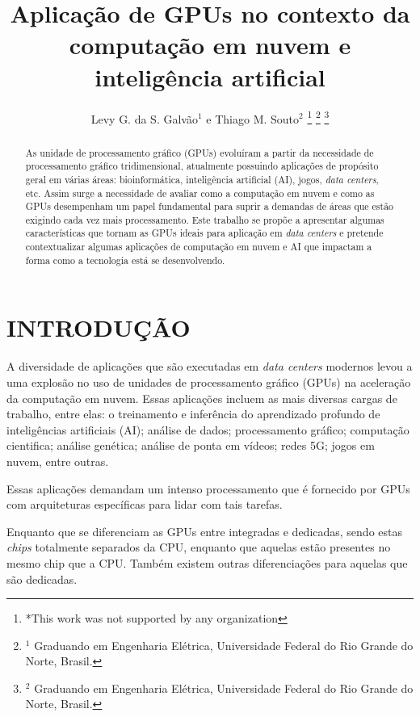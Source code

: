 \documentclass[letterpaper, 10 pt, conference]{ieeeconf}  %
\title{\LARGE \bf
Aplicação de GPUs no contexto da computação em nuvem e inteligência artificial}
\author{Levy G. da S. Galvão$^{1}$ e Thiago M. Souto$^{2}$%
\thanks{*This work was not supported by any organization}%
\thanks{$^{1}$ Graduando em Engenharia Elétrica, Universidade Federal do Rio Grande do Norte, Brasil.}%
\thanks{$^{2}$ Graduando em Engenharia Elétrica, Universidade Federal do Rio Grande do Norte, Brasil.}%
}
\begin{document}
\maketitle
\thispagestyle{empty}
\pagestyle{empty}


\begin{abstract}

As unidade de processamento gráfico (GPUs) evoluíram a partir da necessidade de processamento gráfico tridimensional, atualmente possuindo aplicações de propósito geral em várias áreas: bioinformática, inteligência artificial (AI), jogos, \textit{data centers}, etc. Assim surge a necessidade de avaliar como a computação em nuvem e como as GPUs desempenham um papel fundamental para suprir a demandas de áreas que estão exigindo cada vez mais processamento. Este trabalho se propõe a apresentar algumas características que tornam as GPUs ideais para aplicação em \textit{data centers} e pretende contextualizar algumas aplicações de computação em nuvem e AI que impactam a forma como a tecnologia está se desenvolvendo.

\end{abstract}


\section{INTRODUÇÃO}

A diversidade de aplicações que são executadas em \textit{data centers} modernos levou a uma explosão no uso de unidades de processamento gráfico (GPUs) na aceleração da computação em nuvem. Essas aplicações incluem as mais diversas cargas de trabalho, entre elas: o treinamento e inferência do aprendizado profundo de inteligências artificiais (AI); análise de dados; processamento gráfico; computação cientifica; análise genética; análise de ponta em vídeos; redes 5G; jogos em nuvem, entre outras. 

Essas aplicações demandam um intenso processamento que é fornecido por GPUs com arquiteturas específicas para lidar com tais tarefas.

Enquanto que se diferenciam as GPUs entre integradas e dedicadas, sendo estas \textit{chips} totalmente separados da CPU, enquanto que aquelas estão presentes no mesmo chip que a CPU. Também existem outras diferenciações para aquelas que são dedicadas. 
\end{document}
